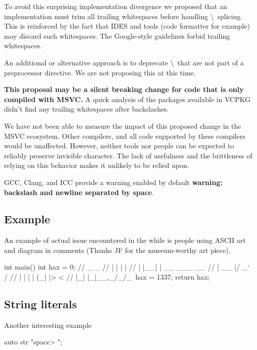 \documentclass{wg21}
\begin{document}
To avoid this surprising implementation divergence we proposed that an implementation must trim all trailing whitespaces before handling \textbackslash \ splicing.
This is reinforced by the fact that IDES and tools (code formatter for example) may discard such whitespaces. The Google-style guidelines forbid trailing whitespaces.

An additional or alternative approach is to deprecate \textbackslash \ that are not part of a preprocessor directive.
We are not proposing this at this time.

\textbf{This proposal may be a silent breaking change for code that is only compiled with MSVC.}
A quick analysis of the packages available in VCPKG didn't find any trailing whitespaces after backslashes.

We have not been able to measure the impact of this proposed change in the MSVC ecosystem. Other compilers, 
and all code supported by these compilers would be unaffected.
However, neither tools nor people can be expected to reliably preserve invisible character.
The lack of usefulness and the brittleness of relying on this behavior makes it unlikely to be relied upon.

GCC, Clang, and ICC provide a warning enabled by default \textbf{warning: backslash and newline separated by space}.

\subsection{Example}

An example of actual issue encountered in the while is people using ASCII art and diagram in comments (Thanks JF for the museum-worthy art piece).

\begin{colorblock}
int main() {
    int hax = 0;
    //  _    _            
    // | |  | |          
    // | |__| | __ ___  __
    // |  __  |/ _` \ \/ /
    // | |  | | (_| |>  <  
    // |_|  |_|\__,_/_/\_\
    hax = 1337;
    return hax;
}
\end{colorblock}


\subsection{String literals}

Another interesting example

\begin{colorblock}
auto str  "\<space>
";
\end{colorblock}
\end{document}
